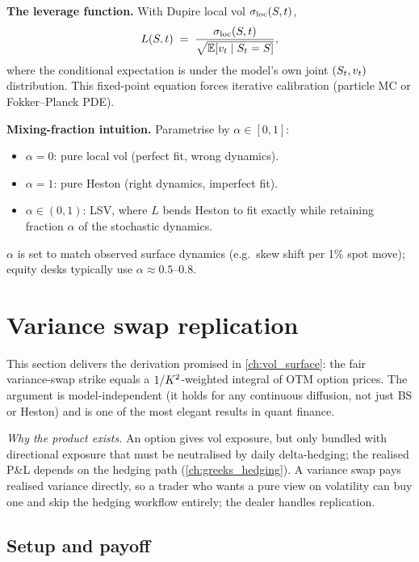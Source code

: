 \noindent
\textbf{The leverage function.} With Dupire local vol
$\sigma_{\text{loc}}(S,t)$,
\begin{equation}
  L(S,t)
  \;=\;
  \frac{\sigma_{\text{loc}}(S,t)}
       {\sqrt{\mathbb{E}[v_t \mid S_t = S]}},
  \label{eq:leverage_function}
\end{equation}
where the conditional expectation is under the model's own joint
$(S_t,v_t)$ distribution. This fixed-point equation forces
iterative calibration (particle MC or Fokker--Planck PDE).

\noindent
\textbf{Mixing-fraction intuition.} Parametrise by $\alpha\in[0,1]$:
\begin{itemize}
  \item $\alpha=0$: pure local vol (perfect fit, wrong dynamics).
  \item $\alpha=1$: pure Heston (right dynamics, imperfect fit).
  \item $\alpha\in(0,1)$: LSV, where $L$ bends Heston to fit exactly
    while retaining fraction $\alpha$ of the stochastic dynamics.
\end{itemize}
$\alpha$ is set to match observed surface dynamics (e.g.\ skew shift
per 1\% spot move); equity desks typically use $\alpha\approx0.5$--$0.8$.


\section{Variance swap replication}
\label{sec:varswap_replication}

This section delivers the derivation promised in
\cref{ch:vol_surface}: the fair variance-swap strike equals a
$1/K^2$-weighted integral of OTM option prices. The argument
is model-independent (it holds for any continuous diffusion, not just
BS or Heston) and is one of the most elegant results in quant finance.

\emph{Why the product exists.} An option gives vol exposure, but only
bundled with directional exposure that must be neutralised by daily
delta-hedging; the realised P\&L depends on the hedging path
(\cref{ch:greeks_hedging}). A variance swap pays realised variance
directly, so a trader who wants a pure view on volatility can buy one
and skip the hedging workflow entirely; the dealer handles replication.

\subsection{Setup and payoff}
\label{subsec:varswap_setup}

